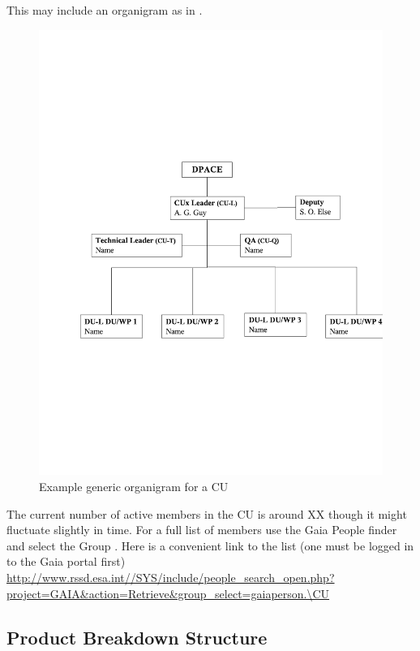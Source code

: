 \documentclass[CUx,lsstdraft,SDP]{lsstdoc}
\begin{document}
This may include an organigram as in .

  \begin{figure}[htbp]
  \begin{center}
    \includegraphics[scale=0.5,trim=0 6cm 0 0]{images/organigram}
      \caption{Example generic organigram for a CU  \label{fig:orgdiag}}
  \end{center}

   \end{figure}

The current number of active members in the CU is around XX though
it might fluctuate slightly in time. For a full list of members use
the Gaia People finder and select the Group \CU. Here is a
convenient link to the list (one must be logged in to the Gaia
portal first)
\url{http://www.rssd.esa.int//SYS/include/people_search_open.php?project=GAIA&action=Retrieve&group_select=gaiaperson.\CU}


\subsection{Product Breakdown Structure\label{sect:decomp}}
\end{document}
